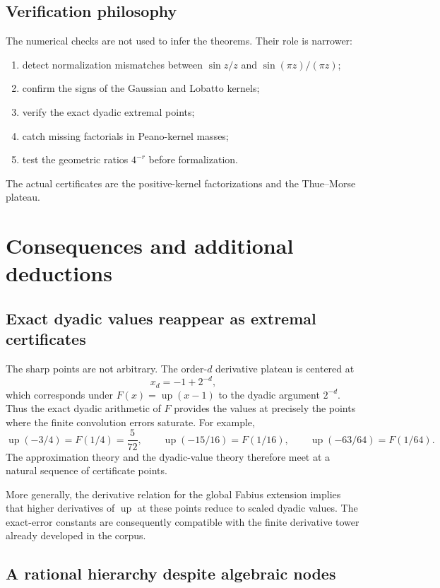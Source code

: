 \documentclass[11pt]{article}
\numberwithin{equation}{section}
\theoremstyle{definition}
\theoremstyle{remark}
\newcommand{\Up}{\operatorname{up}}
\begin{document}
\subsection{Verification philosophy}

The numerical checks are not used to infer the theorems.  Their role is narrower:
\begin{enumerate}
\item detect normalization mismatches between $\sin z/z$ and $\sin(\pi z)/(\pi z)$;
\item confirm the signs of the Gaussian and Lobatto kernels;
\item verify the exact dyadic extremal points;
\item catch missing factorials in Peano-kernel masses;
\item test the geometric ratios $4^{-r}$ before formalization.
\end{enumerate}
The actual certificates are the positive-kernel factorizations and the Thue--Morse plateau.

\section{Consequences and additional deductions}
\label{sec:consequences}

\subsection{Exact dyadic values reappear as extremal certificates}

The sharp points are not arbitrary.  The order-$d$ derivative plateau is centered at
\[
 x_d=-1+2^{-d},
\]
which corresponds under $F(x)=\Up(x-1)$ to the dyadic argument $2^{-d}$.  Thus the exact dyadic arithmetic of $F$ provides the values at precisely the points where the finite convolution errors saturate.  For example,
\[
 \Up(-3/4)=F(1/4)=\frac5{72},
 \qquad
 \Up(-15/16)=F(1/16),
 \qquad
 \Up(-63/64)=F(1/64).
\]
The approximation theory and the dyadic-value theory therefore meet at a natural sequence of certificate points.

More generally, the derivative relation for the global Fabius extension implies that higher derivatives of $\Up$ at these points reduce to scaled dyadic values.  The exact-error constants are consequently compatible with the finite derivative tower already developed in the corpus.

\subsection{A rational hierarchy despite algebraic nodes}
\end{document}

